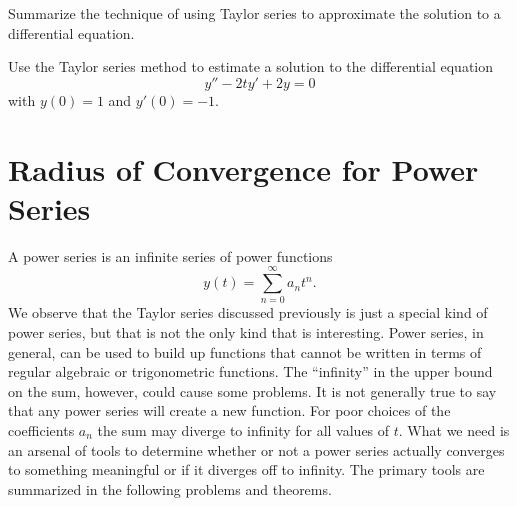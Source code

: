 \begin{problem}
    Summarize the technique of using Taylor series to approximate the solution to a
    differential equation.
\end{problem}

\begin{problem}
    Use the Taylor series method to estimate a solution to the differential equation
    \[ y'' - 2ty' + 2y = 0 \]
    with $y(0) = 1$ and $y'(0)=-1$.
\end{problem}



\newpage\section{Radius of Convergence for Power Series}
A power series is an infinite series of power functions
\[ y(t) = \sum_{n=0}^\infty a_n t^n. \]
We observe that the Taylor series discussed previously is just a special kind of power
series, but that is not the only kind that is interesting.  Power series, in general, can
be used to build up functions that cannot be written in terms of regular algebraic or
trigonometric functions.  The ``infinity'' in the upper bound on the sum, however, could
cause some problems.  It is not generally true to say that any power series will create a
new function.  For poor choices of the coefficients $a_n$ the sum may diverge to infinity
for all values of $t$.  What we need is an arsenal of tools to determine whether or not a
power series actually converges to something meaningful or if it diverges off to infinity.
The primary tools are summarized in the following problems and theorems.


